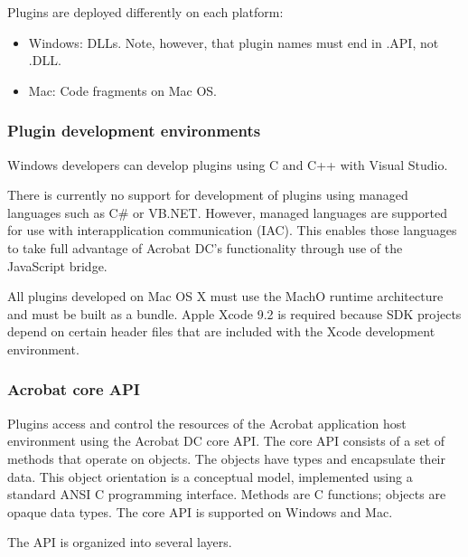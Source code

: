 \documentclass[letterpaper,12pt,english,openany,oneside]{sphinxmanual}
\begin{document}
Plug\sphinxhyphen{}ins are deployed differently on each platform:
\begin{itemize}
\item {} 
Windows: DLLs. Note, however, that plug\sphinxhyphen{}in names must end in .API, not .DLL.

\item {} 
Mac: Code fragments on Mac OS.

\end{itemize}


\subsubsection{Plug\sphinxhyphen{}in development environments}
\label{\detokenize{index:plug-in-development-environments}}
Windows developers can develop plug\sphinxhyphen{}ins using C and C++ with Visual Studio.

There is currently no support for development of plug\sphinxhyphen{}ins using managed languages such as C\# or VB.NET. However, managed languages are supported for use with interapplication communication (IAC). This enables those languages to take full advantage of Acrobat DC’s functionality through use of the JavaScript bridge.

All plug\sphinxhyphen{}ins developed on Mac OS X must use the Mach\sphinxhyphen{}O runtime architecture and must be built as a bundle. Apple Xcode 9.2 is required because SDK projects depend on certain header files that are included with the Xcode development environment.




\subsubsection{Acrobat core API}
\label{\detokenize{index:acrobat-core-api}}
Plug\sphinxhyphen{}ins access and control the resources of the Acrobat application host environment using the Acrobat DC core API. The core API consists of a set of methods that operate on objects. The objects have types and encapsulate their data. This object orientation is a conceptual model, implemented using a standard ANSI C programming interface. Methods are C functions; objects are opaque data types. The core API is supported on Windows and Mac.

The API is organized into several layers.
\end{document}
